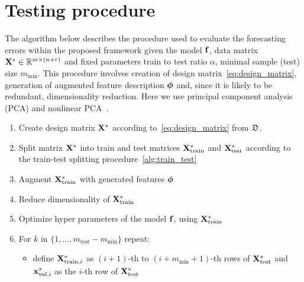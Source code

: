 \documentclass[conference]{IEEEtran}
\begin{document}
\section{Testing procedure}
The algorithm below describes the procedure used to evaluate the forecasting errors within the proposed framework given the model ${\mathbf{f}}$,  data matrix ${\mathbf{X}}^{*} \in \mathbb{R}^{m\times(n+r)}$ and fixed parameters train to test ratio $\alpha$, minimal sample (test) size $m_{\min}$. This procedure involves creation of design matrix~\eqref{eq:design_matrix}, generation of augmented feature description ${\boldsymbol{\phi}}$ and, since it is likely to be redundant, dimensionality reduction. Here we use principal component analysis (PCA) and nonlinear PCA~\cite{}.
\begin{enumerate}[1)]
\item Create design matrix ${\mathbf{X}}^{*}$ according to~\eqref{eq:design_matrix} from ${\mathfrak{D}}$.
\item Split matrix ${\mathbf{X}}^{*}$ into train and test matrices ${\mathbf{X}}^{*}_{\text{train}}$ and ${\mathbf{X}}^{*}_{\text{test}}$
according to the train-test splitting procedure~\ref{alg:train_test}\;
\item Augment ${\mathbf{X}}^{*}_{\text{train}}$ with generated features ${\boldsymbol{\phi}}$\;
\item Reduce dimensionality of ${\mathbf{X}}^{*}_{\text{train}}$ \;
\item Optimize hyper parameters of the model ${\mathbf{f}}$, using ${\mathbf{X}}^{*}_{\text{train}}$\;
\item
For $k$ in $\{1, \dots,  m_{\text{test}} - m_{\min}\}$ repeat:
\begin{itemize}
\item define ${\mathbf{X}}^{*}_{\text{train}, i}$ as $(i+1)$-th to $(i+ m_{\min} + 1)$-th rows of ${\mathbf{X}}^{*}_{\text{test}}$ and
  ${\mathbf{x}}^{*}_{\text{val}, i}$ as the $i$-th row of ${\mathbf{X}}^{*}_{\text{test}}$\;


\end{itemize}
\end{enumerate}
\end{document}
